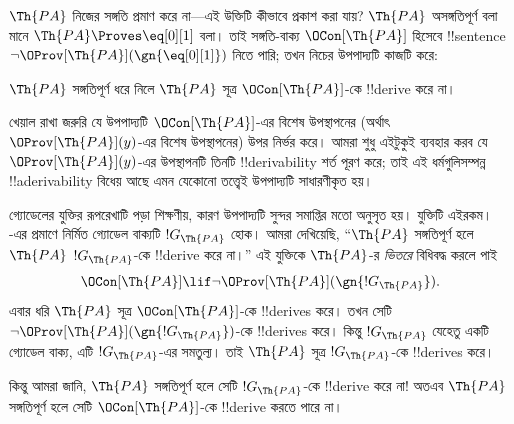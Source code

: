 \documentclass[../../../include/open-logic-section]{subfiles}
\begin{document}


$\Th{PA}$ নিজের সঙ্গতি প্রমাণ করে না—এই উক্তিটি কীভাবে প্রকাশ করা যায়?
$\Th{PA}$ অসঙ্গতিপূর্ণ বলা মানে $\Th{PA} \Proves \eq[0][1]$ বলা। তাই
সঙ্গতি-বাক্য $\OCon[\Th{PA}]$ হিসেবে !!{sentence} $\lnot
\OProv[\Th{PA}](\gn{\eq[0][1]})$ নিতে পারি; তখন নিচের উপপাদ্যটি কাজটি
করে:

\begin{thm}
$\Th{PA}$ সঙ্গতিপূর্ণ ধরে নিলে $\Th{PA}$ সূত্র $\OCon[\Th{PA}]$-কে
!!{derive} করে না।
\end{thm}

খেয়াল রাখা জরুরি যে উপপাদ্যটি $\OCon[\Th{PA}]$-এর বিশেষ উপস্থাপনের
(অর্থাৎ $\OProv[\Th{PA}](y)$-এর বিশেষ উপস্থাপনের) উপর নির্ভর করে। আমরা
শুধু এইটুকুই ব্যবহার করব যে $\OProv[\Th{PA}](y)$-এর উপস্থাপনটি তিনটি
!!{derivability} শর্ত পূরণ করে; তাই এই ধর্মগুলিসম্পন্ন
!!a{derivability} বিধেয় আছে এমন যেকোনো তত্ত্বেই উপপাদ্যটি সাধারণীকৃত হয়।

গ্যোডেলের যুক্তির রূপরেখাটি পড়া শিক্ষণীয়, কারণ উপপাদ্যটি সুন্দর
সমাপ্তির মতো অনুসৃত হয়। যুক্তিটি এইরকম।
-এর প্রমাণে নির্মিত গ্যোডেল বাক্যটি
$!G_\Th{PA}$ হোক। আমরা দেখিয়েছি, ``$\Th{PA}$ সঙ্গতিপূর্ণ হলে
$\Th{PA}$ $!G_\Th{PA}$-কে !!{derive} করে না।'' এই যুক্তিকে
$\Th{PA}$-র \emph{ভিতরে} বিধিবদ্ধ করলে পাই
\[
\OCon[\Th{PA}] \lif \lnot \OProv[\Th{PA}](\gn{!G_\Th{PA}}).
\]
এবার ধরি $\Th{PA}$ সূত্র $\OCon[\Th{PA}]$-কে !!{derive}s করে। তখন সেটি
$\lnot \OProv[\Th{PA}](\gn{!G_\Th{PA}})$-কে !!{derive}s করে। কিন্তু
$!G_\Th{PA}$ যেহেতু একটি গ্যোডেল বাক্য, এটি $!G_\Th{PA}$-এর সমতুল্য।
তাই $\Th{PA}$ সূত্র $!G_\Th{PA}$-কে !!{derive}s করে।

কিন্তু আমরা জানি, $\Th{PA}$ সঙ্গতিপূর্ণ হলে সেটি $!G_\Th{PA}$-কে
!!{derive} করে না!{} অতএব $\Th{PA}$ সঙ্গতিপূর্ণ হলে সেটি
$\OCon[\Th{PA}]$-কে !!{derive} করতে পারে না।
\end{document}
